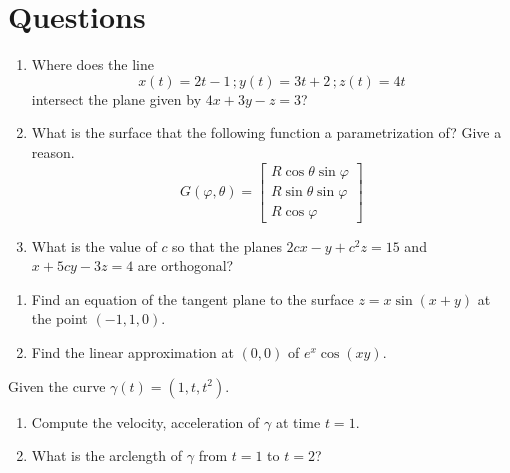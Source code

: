 \documentclass[12pt]{amsart}
\begin{document}
\section*{Questions}
\begin{problem}
\begin{enumerate}
	\item Where does the line
	      \begin{equation*}
		      x(t) = 2t-1 \,; y(t) = 3t + 2 \,; z(t) = 4t
	      \end{equation*}
	      intersect the plane given by $4x + 3y - z = 3$?
	      \vspace{7cm}

	\item What is the surface that the following function a parametrization of?
	      Give a reason.
	      \begin{equation*}
		      G(\varphi, \theta) = \begin{bmatrix}
			      R \cos \theta \sin \varphi \\
			      R \sin \theta \sin \varphi \\
			      R \cos \varphi
		      \end{bmatrix}
	      \end{equation*}

	      \vspace{7cm}

	      \newpage

	\item
	      What is the value of $c$ so that the planes
	      $2cx - y + c^2z = 15$ and $x + 5cy - 3z = 4$ are orthogonal?
\end{enumerate}
\end{problem}


\newpage

\begin{problem}[20 points]
\begin{enumerate}
	\item Find an equation of the tangent plane to the surface $z= x \sin(x+y)$ at the point $(-1,1,0)$.
	      \vspace{8cm}
	\item Find the linear approximation at $(0,0)$ of
	      $e^x \cos(xy)$.
\end{enumerate}
\end{problem}
\newpage


\begin{problem}[20 points]
Given the curve  $\gamma(t) = (1, t, t^2)$.
\begin{enumerate}
	\item Compute the velocity, acceleration of $\gamma$ at time $t=1$.
	\item What is the arclength of $\gamma$ from $t=1$ to $t=2$?
\end{enumerate}
\end{problem}
\end{document}

